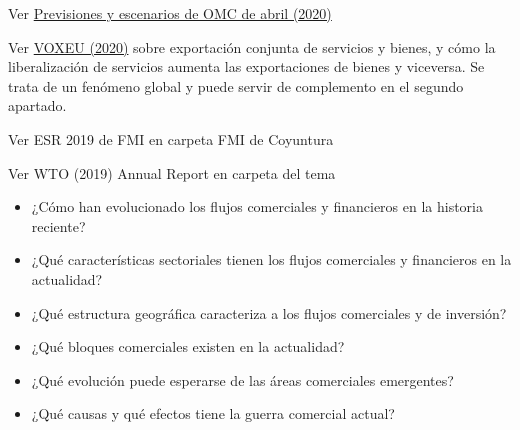 \documentclass{nuevotema}
\begin{document}
\ideaclave

Ver \href{https://www.wto.org/english/news_e/pres20_e/pr855_e.htm}{Previsiones y escenarios de OMC de abril (2020)}


Ver \href{https://voxeu.org/article/how-services-boost-goods-exports}{VOXEU (2020)} sobre exportación conjunta de servicios y bienes, y cómo la liberalización de servicios aumenta las exportaciones de bienes y viceversa. Se trata de un fenómeno global y puede servir de complemento en el segundo apartado.

Ver ESR 2019 de FMI en carpeta FMI de Coyuntura

Ver WTO (2019) Annual Report en carpeta del tema


\begin{itemize}
	\item ¿Cómo han evolucionado los flujos comerciales y financieros en la historia reciente?
	\item ¿Qué características sectoriales tienen los flujos comerciales y financieros en la actualidad?
	\item ¿Qué estructura geográfica caracteriza a los flujos comerciales y de inversión?
	\item ¿Qué bloques comerciales existen en la actualidad? 
	\item ¿Qué evolución puede esperarse de las áreas comerciales emergentes?
	\item ¿Qué causas y qué efectos tiene la guerra comercial actual?
\end{itemize}

\esquemacorto
\end{document}
